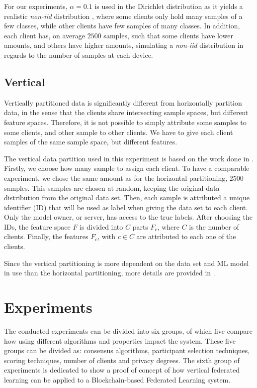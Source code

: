 For our experiments, $\alpha = 0.1$ is used in the Dirichlet distribution as it yields a realistic \textit{non-iid} distribution \cite{10.48550/arxiv.2006.07242}, where some clients only hold many samples of a few classes, while other clients have few samples of many classes. In addition, each client has, on average $2500$ samples, such that some clients have lower amounts, and others have higher amounts, simulating a \textit{non-iid} distribution in regards to the number of samples at each device.

\subsection{Vertical}\label{subsection:verticalpartitioning}

Vertically partitioned data is significantly different from horizontally partition data, in the sense that the clients share intersecting sample spaces, but different feature spaces. Therefore, it is not possible to simply attribute some samples to some clients, and other sample to other clients. We have to give each client samples of the same sample space, but different features.

The vertical data partition used in this experiment is based on the work done in \cite{10.48550/arxiv.2104.00489}. Firstly, we choose how many sample to assign each client. To have a comparable experiment, we chose the same amount as for the horizontal partitioning, $2500$ samples. This samples are chosen at random, keeping the original data distribution from the original data set. Then, each sample is attributed a unique identifier (ID) that will be used as label when giving the data set to each client. Only the model owner, or server, has access to the true labels. After choosing the IDs, the feature space $F$ is divided into $C$ parts $F_c$, where $C$ is the number of clients. Finally, the features $F_c$, with $c \in C$ are attributed to each one of the clients.

Since the vertical partitioning is more dependent on the data set and ML model in use than the horizontal partitioning, more details are provided in .

\section{Experiments}\label{meth:experiments}

The conducted experiments can be divided into six groups, of which five compare how using different algorithms and properties impact the system. These five groups can be divided as: consensus algorithms, participant selection techniques, scoring techniques, number of clients and privacy degrees. The sixth group of experiments is dedicated to show a proof of concept of how vertical federated learning can be applied to a Blockchain-based Federated Learning system.

